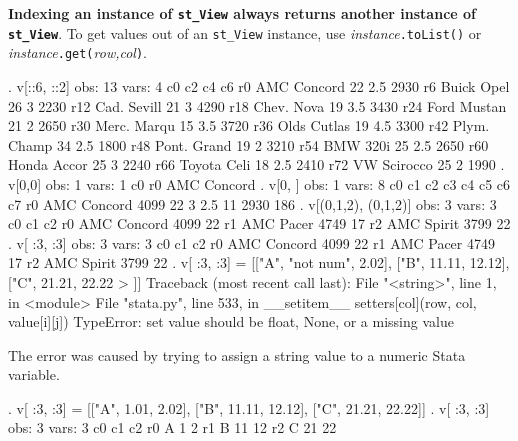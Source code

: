 \documentclass{article}
\begin{document}
\textbf{Indexing an instance of \lstinline{st_View} always returns another instance of \lstinline{st_View}}. To get values out of an \lstinline{st_View} instance, use \textit{instance}\lstinline{.toList()} or \textit{instance}\lstinline{.get(}\textit{row,col}\lstinline{)}.

\vspace{3mm}

\begin{stlog}
{\smallskip}
. v[::6, ::2]
{\smallskip}
  obs: 13
 vars:  4
{\smallskip}
             c0        c2        c4        c6
 r0 AMC Concord        22       2.5      2930
 r6  Buick Opel        26         3      2230
r12 Cad. Sevill        21         3      4290
r18  Chev. Nova        19       3.5      3430
r24 Ford Mustan        21         2      2650
r30 Merc. Marqu        15       3.5      3720
r36 Olds Cutlas        19       4.5      3300
r42 Plym. Champ        34       2.5      1800
r48 Pont. Grand        19         2      3210
r54    BMW 320i        25       2.5      2650
r60 Honda Accor        25         3      2240
r66 Toyota Celi        18       2.5      2410
r72 VW Scirocco        25         2      1990
{\smallskip}
. v[0,0]
{\smallskip}
  obs: 1
 vars: 1
{\smallskip}
            c0
r0 AMC Concord
{\smallskip}
. v[0, ]
{\smallskip}
  obs: 1
 vars: 8
{\smallskip}
            c0       c1       c2       c3       c4       c5       c6       c7
r0 AMC Concord     4099       22        3      2.5       11     2930      186
{\smallskip}
. v[(0,1,2), (0,1,2)]
{\smallskip}
  obs: 3
 vars: 3
{\smallskip}
            c0        c1        c2
r0 AMC Concord      4099        22
r1   AMC Pacer      4749        17
r2  AMC Spirit      3799        22
{\smallskip}
. v[ :3, :3]
{\smallskip}
  obs: 3
 vars: 3
{\smallskip}
            c0        c1        c2
r0 AMC Concord      4099        22
r1   AMC Pacer      4749        17
r2  AMC Spirit      3799        22
{\smallskip}
. v[ :3, :3] = [["A", "not num", 2.02], ["B", 11.11, 12.12], ["C", 21.21, 22.22
> ]]
{\color{red}Traceback (most recent call last):
  File "<string>", line 1, in <module>
  File "stata.py", line 533, in __setitem__
    setters[col](row, col, value[i][j])
TypeError: set value should be float, None, or a missing value}
\end{stlog}

\vspace{3mm}
The error was caused by trying to assign a string value to a numeric Stata variable.
\vspace{3mm}

\begin{stlog}
{\smallskip}
. v[ :3, :3] = [["A", 1.01, 2.02], ["B", 11.11, 12.12], ["C", 21.21, 22.22]]
{\smallskip}
. v[ :3, :3]
{\smallskip}
  obs: 3
 vars: 3
{\smallskip}
            c0        c1        c2
r0           A         1         2
r1           B        11        12
r2           C        21        22
\end{stlog}
\end{document}
